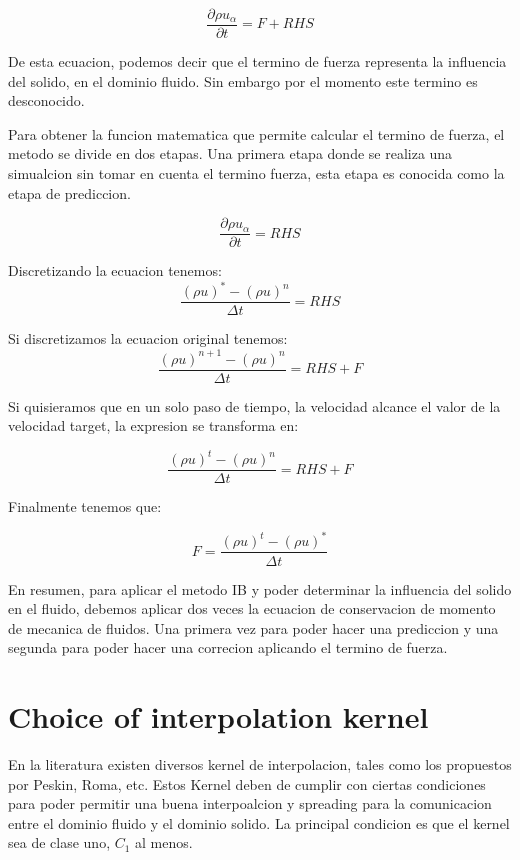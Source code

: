 \begin{equation}
	\frac{\partial \rho u_\alpha}{\partial t}  = F + RHS
\end{equation}

De esta ecuacion, podemos decir que el termino de fuerza representa la influencia del solido,
en el dominio fluido. Sin embargo por el momento este termino es desconocido.

Para obtener la funcion matematica que permite calcular el termino de fuerza, el
metodo se divide en dos etapas. Una primera etapa donde se realiza una
simualcion sin tomar en cuenta el termino fuerza, esta etapa es conocida como la
etapa de prediccion.

\begin{equation}
	\frac{\partial \rho u_\alpha}{\partial t}  = RHS
\end{equation}

Discretizando la ecuacion tenemos:
\begin{equation}
	\frac{ (\rho u)^* - (\rho u)^n}{\Delta t}  = RHS
\end{equation}

Si discretizamos la ecuacion original tenemos:
\begin{equation}
	\frac{ (\rho u)^{n+1} - (\rho u)^n}{\Delta t}  = RHS + F
\end{equation}

Si quisieramos que en un solo paso de tiempo, la velocidad alcance el valor de
la velocidad target, la expresion se transforma en: 

\begin{equation}
	\frac{ (\rho u)^{t} - (\rho u)^n}{\Delta t}  = RHS + F
\end{equation}

Finalmente tenemos que:

\begin{equation}
	F = \frac{(\rho u)^{t} - (\rho u)^*}{\Delta t}
\end{equation}


En resumen, para aplicar el metodo IB y poder determinar la influencia del
solido en el fluido, debemos aplicar dos veces la ecuacion de conservacion de
momento de mecanica de fluidos. Una primera vez para poder hacer una prediccion
y una segunda para poder hacer una correcion aplicando el termino de fuerza.





\section{Choice of interpolation kernel}
En la literatura existen diversos kernel de interpolacion, tales como los
propuestos por Peskin, Roma, etc. Estos Kernel deben de cumplir con ciertas
condiciones para poder permitir una buena interpoalcion y spreading para la
comunicacion entre el dominio fluido y el dominio solido. La principal
condicion es que el kernel sea de clase uno, $C_1$ al menos.

